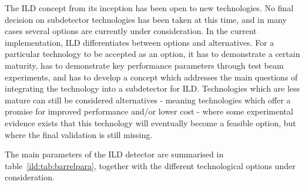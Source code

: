 \documentclass[%
 amsmath,amssymb,
 aps,
 longbibliography,
]{revtex4-1}
\begin{document}
The ILD concept from its inception has been open to new technologies. 
No final decision on subdetector technologies has been taken at this time, and in many cases several options are currently under consideration. In the current implementation, ILD differentiates between options and alternatives. 
For a particular technology to be accepted as an option, it has to demonstrate a certain maturity, has to demonstrate key performance parameters through test beam experiments, and has to develop a concept which addresses the main questions of integrating the technology into a subdetector for ILD. Technologies which are less mature can still be considered alternatives - meaning technologies which offer a promise for improved performance and/or lower cost - where some experimental evidence exists that this technology will eventually become a feasible option, but where the final validation is still missing. 

The main parameters of the ILD detector are summarised in table~\ref{ild:tab:barrelpara}, together with the different technological options under consideration. 
\end{document}
